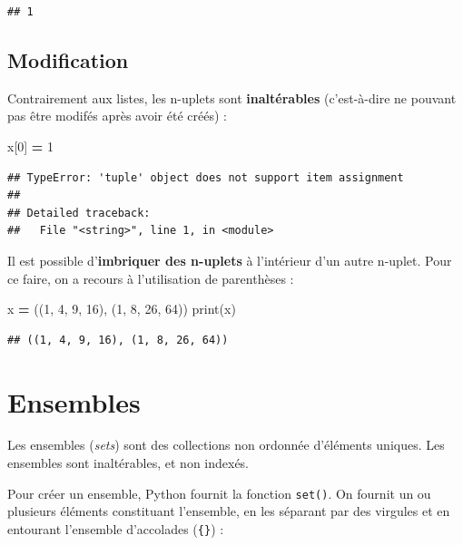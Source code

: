 \documentclass[12pt,]{book}
\newenvironment{Shaded}{\begin{snugshade}}{\end{snugshade}}
\newcommand{\DecValTok}[1]{\textcolor[rgb]{0.00,0.00,0.81}{#1}}
\newcommand{\OperatorTok}[1]{\textcolor[rgb]{0.81,0.36,0.00}{\textbf{#1}}}
\newcommand{\BuiltInTok}[1]{#1}
\newcommand{\NormalTok}[1]{#1}
\numberwithin{equation}{section}
\numberwithin{countremarque}{section}
\begin{document}
\begin{lstlisting}
## 1
\end{lstlisting}

\subsection{Modification}\label{modification-1}

Contrairement aux listes, les n-uplets sont \textbf{inaltérables}
(c'est-à-dire ne pouvant pas être modifés après avoir été créés) :

\begin{Shaded}
\begin{Highlighting}[]
\NormalTok{x[}\DecValTok{0}\NormalTok{] }\OperatorTok{=} \DecValTok{1}
\end{Highlighting}
\end{Shaded}

\begin{lstlisting}
## TypeError: 'tuple' object does not support item assignment
## 
## Detailed traceback: 
##   File "<string>", line 1, in <module>
\end{lstlisting}

Il est possible d'\textbf{imbriquer des n-uplets} à l'intérieur d'un
autre n-uplet. Pour ce faire, on a recours à l'utilisation de
parenthèses :

\begin{Shaded}
\begin{Highlighting}[]
\NormalTok{x }\OperatorTok{=}\NormalTok{ ((}\DecValTok{1}\NormalTok{, }\DecValTok{4}\NormalTok{, }\DecValTok{9}\NormalTok{, }\DecValTok{16}\NormalTok{), (}\DecValTok{1}\NormalTok{, }\DecValTok{8}\NormalTok{, }\DecValTok{26}\NormalTok{, }\DecValTok{64}\NormalTok{))}
\BuiltInTok{print}\NormalTok{(x)}
\end{Highlighting}
\end{Shaded}

\begin{lstlisting}
## ((1, 4, 9, 16), (1, 8, 26, 64))
\end{lstlisting}

\section{Ensembles}\label{structure-ensembles}

Les ensembles (\emph{sets}) sont des collections non ordonnée d'éléments
uniques. Les ensembles sont inaltérables, et non indexés.

Pour créer un ensemble, Python fournit la fonction \texttt{set()}. On
fournit un ou plusieurs éléments constituant l'ensemble, en les séparant
par des virgules et en entourant l'ensemble d'accolades (\texttt{\{\}})
:
\end{document}
